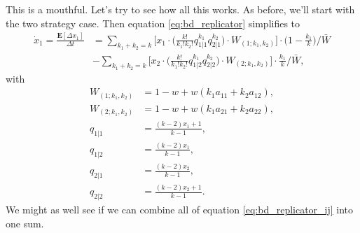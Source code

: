 \documentclass[14pt, justified]{tufte-book}
\begin{document}
This is a mouthful.
Let's try to see how all this works.
As before, we'll start with the two strategy case.
Then equation \ref{eq:bd_replicator} simplifies to
\begin{equation}
    \begin{split}
        \dot{x}_1 = \frac{\mathbf{E}[\Delta x_1]}{\Delta t} & = \sum_{k_1 + k_2 = k}  \Big[ x_1 \cdot \Big( \frac{k!}{k_1!k_2!} q_{1|1}^{k_1} q_{2|1}^{k_2} \Big) \cdot W_{(1; k_1, k_2)} \Big] \cdot \Big(1 - \frac{k_1}{k} \Big)\Big/ \bar{W}
        \\
        & - \sum_{k_1 + k_2 = k} \Big[ x_2 \cdot \Big( \frac{k!}{k_1! k_2!} q_{1|2}^{k_1} q_{2|2}^{k_2} \Big) \cdot W_{(2; k_1, k_2)} \Big] \cdot \frac{k_1}{k} \Big/ \bar{W},
    \end{split}
    \label{eq:bd_replicator_ij}
\end{equation}
with
\begin{equation}
    \begin{split}
        W_{(1; k_1, k_2)} & = 1 - w + w(k_1 a_{11} + k_2 a_{12}),
        \\
        W_{(2; k_1, k_2)} & = 1 - w + w(k_1 a_{21} + k_2 a_{22}),
        \\
        q_{1|1} & = \frac{(k-2)x_1 + 1}{k-1},
        \\
        q_{1|2} & = \frac{(k-2)x_1}{k-1},
        \\
        q_{2|1} & = \frac{(k-2)x_2}{k-1},
        \\
        q_{2|2} & = \frac{(k-2)x_2 + 1}{k-1}.
    \end{split}
\end{equation}
We might as well see if we can combine all of equation \ref{eq:bd_replicator_ij} into one sum.
\end{document}
